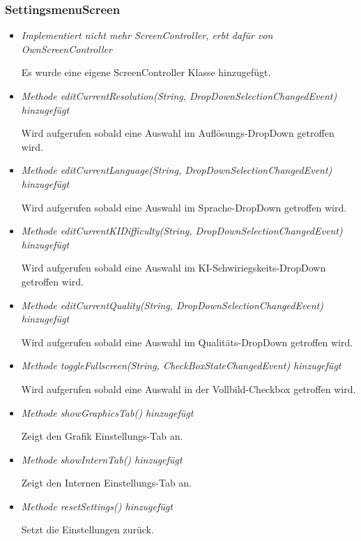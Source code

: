 \subsubsection{SettingsmenuScreen}
\begin{itemize}
    \item \textit{Implementiert nicht mehr ScreenController, erbt dafür von OwnScreenController}
        \begin{leftbar}[0.9\linewidth]
            Es wurde eine eigene ScreenController Klasse hinzugefügt.
        \end{leftbar}
    \item \textit{Methode editCurrentResolution(String, DropDownSelectionChangedEvent) hinzugefügt}
        \begin{leftbar}[0.9\linewidth]
            Wird aufgerufen sobald eine Auswahl im Auflösungs-DropDown getroffen wird.
        \end{leftbar}
    \item \textit{Methode editCurrentLanguage(String, DropDownSelectionChangedEvent) hinzugefügt}
        \begin{leftbar}[0.9\linewidth]
            Wird aufgerufen sobald eine Auswahl im Sprache-DropDown getroffen wird.
        \end{leftbar}
    \item \textit{Methode editCurrentKIDifficulty(String, DropDownSelectionChangedEvent) hinzugefügt}
        \begin{leftbar}[0.9\linewidth]
            Wird aufgerufen sobald eine Auswahl im KI-Schwiriegskeits-DropDown getroffen wird.
        \end{leftbar}
    \item \textit{Methode editCurrentQuality(String, DropDownSelectionChangedEvent) hinzugefügt}
        \begin{leftbar}[0.9\linewidth]
            Wird aufgerufen sobald eine Auswahl im Qualitäts-DropDown getroffen wird.
        \end{leftbar}
    \item \textit{Methode toggleFullscreen(String, CheckBoxStateChangedEvent) hinzugefügt}
        \begin{leftbar}[0.9\linewidth]
            Wird aufgerufen sobald eine Auswahl in der Vollbild-Checkbox getroffen wird.
        \end{leftbar}
    \item \textit{Methode showGraphicsTab() hinzugefügt}
        \begin{leftbar}[0.9\linewidth]
            Zeigt den Grafik Einstellungs-Tab an.
        \end{leftbar}
    \item \textit{Methode showInternTab() hinzugefügt}
        \begin{leftbar}[0.9\linewidth]
            Zeigt den Internen Einstellungs-Tab an.
        \end{leftbar}
    \item \textit{Methode resetSettings() hinzugefügt}
        \begin{leftbar}[0.9\linewidth]
            Setzt die Einstellungen zurück.
        \end{leftbar}
\end{itemize}

